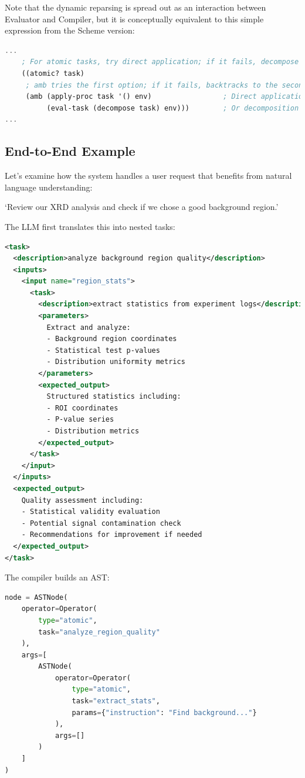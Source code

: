 \documentclass{article}
\begin{document}
Note that the dynamic reparsing is spread out as an interaction between Evaluator and Compiler, but it is conceptually equivalent to this simple expression from the Scheme version: 

\begin{lstlisting}[language=Scheme, caption = nondeterministic evaluation using the amb (ambiguous) operator]
...
    ; For atomic tasks, try direct application; if it fails, decompose
    ((atomic? task)
     ; amb tries the first option; if it fails, backtracks to the second
     (amb (apply-proc task '() env)                 ; Direct application
          (eval-task (decompose task) env)))        ; Or decomposition
...
\end{lstlisting}


\subsection{End-to-End Example}

Let's examine how the system handles a user request that benefits from natural language understanding:

`Review our XRD analysis and check if we chose a good background region.'

The LLM first translates this into nested tasks:

\begin{lstlisting}[language=XML]
<task>
  <description>analyze background region quality</description>
  <inputs>
    <input name="region_stats">
      <task>
        <description>extract statistics from experiment logs</description>
        <parameters>
          Extract and analyze:
          - Background region coordinates
          - Statistical test p-values 
          - Distribution uniformity metrics
        </parameters>
        <expected_output>
          Structured statistics including:
          - ROI coordinates
          - P-value series
          - Distribution metrics
        </expected_output>
      </task>
    </input>
  </inputs>
  <expected_output>
    Quality assessment including:
    - Statistical validity evaluation
    - Potential signal contamination check
    - Recommendations for improvement if needed
  </expected_output>
</task>
\end{lstlisting}

The compiler builds an AST:

\begin{lstlisting}[language=Python]
node = ASTNode(
    operator=Operator(
        type="atomic",
        task="analyze_region_quality"
    ),
    args=[
        ASTNode(
            operator=Operator(
                type="atomic",
                task="extract_stats",
                params={"instruction": "Find background..."}
            ),
            args=[]
        )
    ]
)
\end{lstlisting}
\end{document}
